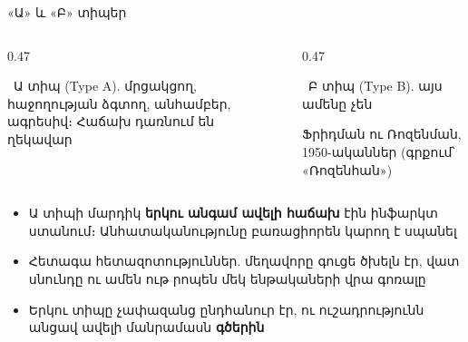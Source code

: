 \begin{frame}{«Ա» և «Բ» տիպեր}
  \begin{columns}[T]
    \begin{column}{0.47\textwidth}
      \begin{card}[colback=brainpink!30!cardwhite]
        \ {\blackfont Ա տիպ} {\scriptsize (Type A)}. մրցակցող, հաջողության ձգտող, անհամբեր, ագրեսիվ։ Հաճախ դառնում են ղեկավար
      \end{card}
    \end{column}
    \begin{column}{0.47\textwidth}
      \begin{card}[colback=mint!35!cardwhite]
        \ {\blackfont Բ տիպ} {\scriptsize (Type B)}. այս ամենը չեն\par\smallskip
        {\scriptsize Ֆրիդման ու Ռոզենման, 1950-ականներ (գրքում՝ «Ռոզենհան»)}
      \end{card}
    \end{column}
  \end{columns}
  \begin{itemize}
    \item<2-> Ա տիպի մարդիկ \textbf{երկու անգամ ավելի հաճախ} էին ինֆարկտ ստանում։ Անհատականությունը բառացիորեն կարող է սպանել 
    \item<3-> Հետագա հետազոտություններ. մեղավորը գուցե ծխելն էր, վատ սնունդը ու ամեն ութ րոպեն մեկ ենթակաների վրա գոռալը
    \item<4-> Երկու տիպը չափազանց ընդհանուր էր, ու ուշադրությունն անցավ ավելի մանրամասն \textbf{գծերին}
  \end{itemize}
\end{frame}

